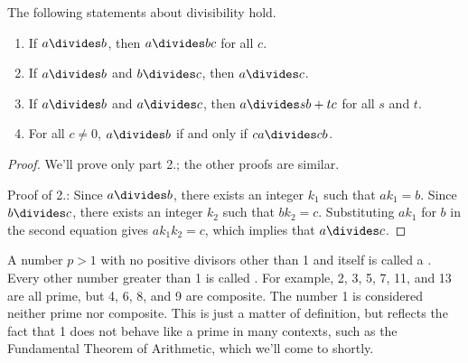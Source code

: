 \begin{lemma}
\label{lem:div}
The following statements about divisibility hold.
%
\begin{enumerate}
\item If $a \divides b$, then $a \divides bc$ for all $c$.
\item If $a \divides b$ and $b \divides c$, then $a \divides c$.
\item If $a \divides b$ and $a \divides c$, then $a \divides sb + tc$ for all $s$ and $t$.
\item For all $c \neq 0$, $a \divides b$ if and only if $ca \divides cb$.
\end{enumerate}
\end{lemma}

\begin{proof}
We'll prove only part 2.; the other proofs are similar.

Proof of 2.:  Since $a \divides b$, there exists an integer $k_1$ such
that $a k_1 = b$.  Since $b \divides c$, there exists an integer $k_2$
such that $b k_2 = c$.  Substituting $a k_1$ for $b$ in the second
equation gives $a k_1 k_2 = c$, which implies that $a \divides c$.

\iffalse
Proof of (4): We must show that $a \divides b$ implies $ca \divides cb$ and
vice-versa.
%
\begin{itemize}
\item First, suppose $a \divides b$.  This means $a k = b$ for some $k$.
Multiplying both sides by $c$ gives $c a k = c b$ for some $k$.  This
implies $ca \divides cb$.
\item Now, suppose $ca \divides cb$.  Then $c a k = c b$ for some $k$.
We can divide both sides by $c$ since $c$ is nonzero, so $a k = b$ for
some $k$.  This means $a \divides b$.
\end{itemize}
\fi
\end{proof}

A number $p > 1$ with no positive divisors other than 1 and itself is
called a .  Every other number greater than 1 is called
.  For example, 2, 3, 5, 7, 11, and 13 are all prime,
but 4, 6, 8, and 9 are composite.  The number 1 is considered neither
prime nor composite.  This is just a matter of definition, but
reflects the fact that 1 does not behave like a prime in many
contexts, such as the Fundamental Theorem of Arithmetic, which we'll
come to shortly.

